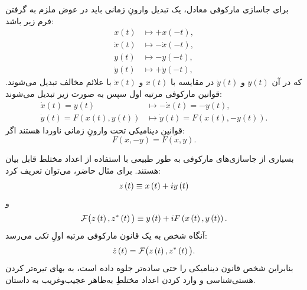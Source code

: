\documentclass{article}
\begin{document}
برای جاسازی مارکوفی معادل، یک تبدیل وارونِ زمانی باید در عوض ملزم به گرفتن فرم زیر باشد:
\begin{align}
x\left(t\right) & \mapsto+x\left(-t\right),\nonumber \\
\dot{x}\left(t\right) & \mapsto-\dot{x}\left(-t\right),\label{eq:1stOrderContinuousMarkovianEmbeddingTimeReversal}\\
y\left(t\right) & \mapsto-y\left(-t\right),\nonumber \\
\dot{y}\left(t\right) & \mapsto+\dot{y}\left(-t\right),\nonumber 
\end{align}
 که در آن $y\left(t\right)$ و $\dot{y}\left(t\right)$ در مقایسه با $x\left(t\right)$ و $\dot{x}\left(t\right)$ با علائم مخالف تبدیل می‌شوند.
قوانین مارکوفی مرتبه اول سپس به صورت زیر تبدیل می‌شوند:
\begin{align}
\dot{x}\left(t\right)=y\left(t\right) & \mapsto-\dot{x}\left(t\right)=-y\left(t\right),\nonumber \\
\dot{y}\left(t\right)=F\left(x\left(t\right),y\left(t\right)\right) & \mapsto\dot{y}\left(t\right)=F\left(x\left(t\right),-y\left(t\right)\right).\label{eq:1stOrderContinuousMarkovianEmbeddingTimeRevLaws}
\end{align}
 قوانین دینامیکی تحت وارونِ زمانی ناوردا هستند اگر:
\begin{equation}
F\left(x,-y\right)=F\left(x,y\right).\label{eq:1stOrderContinuousMarkovianEmbeddingTimeRevInvariantLaw}
\end{equation}

بسیاری از جاسازی‌های مارکوفی به طور طبیعی با استفاده از اعداد مختلط قابل بیان هستند. برای مثال حاضر، می‌توان تعریف کرد:
\begin{equation}
z\left(t\right)\equiv x\left(t\right)+iy\left(t\right)\label{eq:1stOrderContinuousMarkovianEmbeddingComplexVar}
\end{equation}
 و
\begin{equation}
\mathcal{F}\big(z\left(t\right),z^{\ast}\left(t\right)\big)\equiv y\left(t\right)+iF\left(x\left(t\right),y\left(t\right)\right).\label{eq:1stOrderContinuousMarkovianEmbeddingComplexLaw}
\end{equation}
 آنگاه شخص به یک قانون مارکوفی مرتبه اولِ \emph{تکی} می‌رسد:
\begin{equation}
\dot{z}\left(t\right)=\mathcal{F}\big(z\left(t\right),z^{\ast}\left(t\right)\big).\label{eq:1stOrderContinuousMarkovianEmbeddingComplexEquations}
\end{equation}
 بنابراین شخص قانون دینامیکی را حتی ساده‌تر جلوه داده است، به بهای تیره‌تر کردن هستی‌شناسی و وارد کردن اعداد مختلطِ به‌ظاهر عجیب‌وغریب به داستان.
\end{document}
